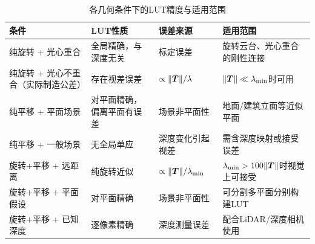 \begin{table}[H]
\centering
\caption{各几何条件下的LUT精度与适用范围}
\label{tab:precision}
\begin{tabularx}{\textwidth}{p{2.8cm}p{2.8cm}Xp{2.5cm}}
\toprule
\textbf{条件} & \textbf{LUT性质} & \textbf{误差来源} & \textbf{适用范围} \\
\midrule
纯旋转 + 光心重合
  & 全局精确，与深度无关
  & 标定误差
  & 旋转云台、光心重合的刚性连接 \\

纯旋转 + 光心不重合\newline（实际制造公差）
  & 存在视差误差
  & $\propto \|\bm{T}\|/\lambda$
  & $\|\bm{T}\| \ll \lambda_{\min}$时可用 \\

纯平移 + 平面场景
  & 对平面精确，偏离平面有误差
  & 场景非平面性
  & 地面/建筑立面等近似平面 \\

纯平移 + 一般场景
  & 无全局单应
  & 深度变化引起视差
  & 需含深度映射或接受误差 \\

旋转+平移 + 远距离
  & 纯旋转近似
  & $\propto \|\bm{T}\|/\lambda_{\min}$
  & $\lambda_{\min} > 100\|\bm{T}\|$时视觉上可接受 \\

旋转+平移 + 平面假设
  & 对平面精确
  & 场景非平面性
  & 可分割多平面分别构建LUT \\

旋转+平移 + 已知深度
  & 逐像素精确
  & 深度测量误差
  & 配合LiDAR/深度相机使用 \\
\bottomrule
\end{tabularx}
\end{table}
